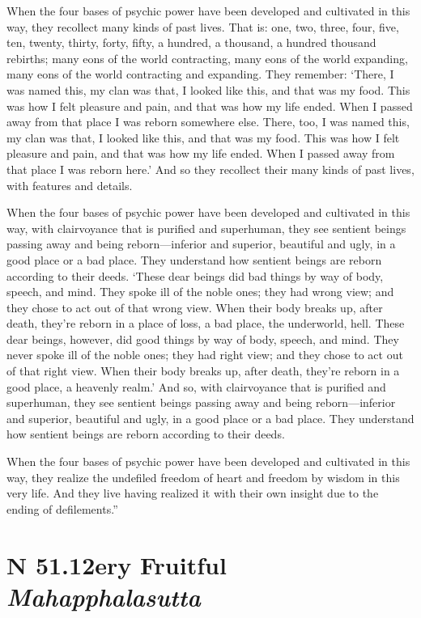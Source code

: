 \documentclass[12pt,openany]{book}%
\newcommand*{\suttatitleacronym}[1]{\smaller[2]{#1}\vspace*{.3em}}
\newcommand*{\suttatitletranslation}[1]{\linebreak{#1}}
\newcommand*{\suttatitleroot}[1]{\linebreak\smaller[2]\itshape{#1}}
\newcommand*{\tocacronym}[1]{\hspace*{-3.3em}{#1}\quad}
\newcommand*{\toctranslation}[1]{#1}
\newcommand*{\tocroot}[1]{(\textit{#1})}
\begin{document}
When the four bases of psychic power have been developed and cultivated in this way, they recollect many kinds of past lives. That is: one, two, three, four, five, ten, twenty, thirty, forty, fifty, a hundred, a thousand, a hundred thousand rebirths; many eons of the world contracting, many eons of the world expanding, many eons of the world contracting and expanding. They remember: ‘There, I was named this, my clan was that, I looked like this, and that was my food. This was how I felt pleasure and pain, and that was how my life ended. When I passed away from that place I was reborn somewhere else. There, too, I was named this, my clan was that, I looked like this, and that was my food. This was how I felt pleasure and pain, and that was how my life ended. When I passed away from that place I was reborn here.’ And so they recollect their many kinds of past lives, with features and details. 

When the four bases of psychic power have been developed and cultivated in this way, with clairvoyance that is purified and superhuman, they see sentient beings passing away and being reborn—inferior and superior, beautiful and ugly, in a good place or a bad place. They understand how sentient beings are reborn according to their deeds. ‘These dear beings did bad things by way of body, speech, and mind. They spoke ill of the noble ones; they had wrong view; and they chose to act out of that wrong view. When their body breaks up, after death, they’re reborn in a place of loss, a bad place, the underworld, hell. These dear beings, however, did good things by way of body, speech, and mind. They never spoke ill of the noble ones; they had right view; and they chose to act out of that right view. When their body breaks up, after death, they’re reborn in a good place, a heavenly realm.’ And so, with clairvoyance that is purified and superhuman, they see sentient beings passing away and being reborn—inferior and superior, beautiful and ugly, in a good place or a bad place. They understand how sentient beings are reborn according to their deeds. 

When the four bases of psychic power have been developed and cultivated in this way, they realize the undefiled freedom of heart and freedom by wisdom in this very life. And they live having realized it with their own insight due to the ending of defilements.” 

%
\section*{{\suttatitleacronym SN 51.12}{\suttatitletranslation Very Fruitful }{\suttatitleroot Mahapphalasutta}}
\addcontentsline{toc}{section}{\tocacronym{SN 51.12} \toctranslation{Very Fruitful } \tocroot{Mahapphalasutta}}
\end{document}
